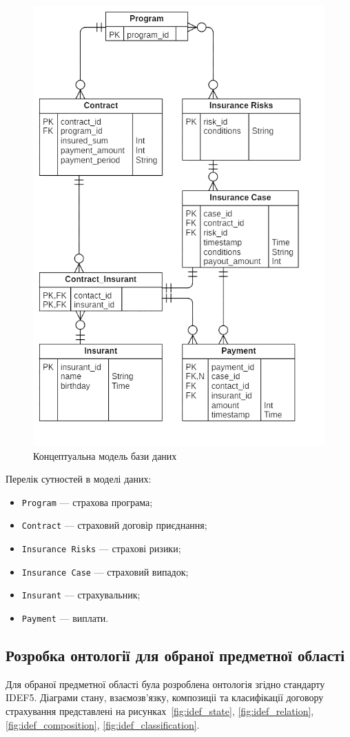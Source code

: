 \begin{figure}[H]
    \centering
        \includegraphics[width=0.6\linewidth]{er}
    \caption{Концептуальна модель бази даних}
    \label{fig:er}
\end{figure}

Перелік сутностей в моделі даних: 
\begin{itemize}
  \item \texttt{Program} --- страхова програма;
  \item \texttt{Contract} --- страховий договір приєднання;
  \item \texttt{Insurance Risks} --- страхові ризики;
  \item \texttt{Insurance Case} --- страховий випадок;
  \item \texttt{Insurant} --- страхувальник;
  \item \texttt{Payment} --- виплати.
\end{itemize}

\subsection{Розробка онтології для обраної предметної області}
Для обраної предметної області була розроблена онтологія згідно стандарту IDEF5. 
Діаграми стану, взаємозв'язку, композиціі та класифікації договору страхування представлені на рисунках~\ref{fig:idef_state}, \ref{fig:idef_relation}, \ref{fig:idef_composition}, \ref{fig:idef_classification}.

